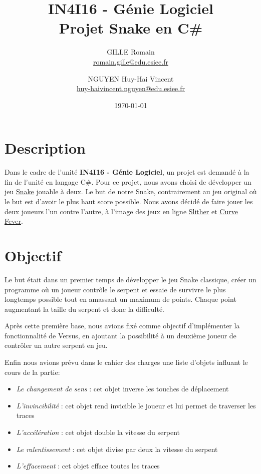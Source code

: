 \documentclass[12pt, french, a4paper]{article}
\title{
  \textbf{IN4I16 - Génie Logiciel\\
  Projet Snake en C\#}
}
\author{
  GILLE Romain \\
  \href{mailto:romain.gille@edu.esiee.fr}{romain.gille@edu.esiee.fr}
  \and
  NGUYEN Huy-Hai Vincent \\
  \href{mailto:huy-haivincent.nguyen@edu.esiee.fr}{huy-haivincent.nguyen@edu.esiee.fr}
}
\date{\today}
\begin{document}
  \maketitle
  \newpage


  \tableofcontents
  \newpage

  \section{Description}
    Dans le cadre de l'unité \textbf{IN4I16 - Génie Logiciel}, un projet est demandé à la fin de l'unité en langage C\#. Pour ce projet, nous avons choisi de développer un jeu \href{https://fr.wikipedia.org/wiki/Snake_(jeu_vid%C3%A9o)}{\underline{Snake}} jouable à deux.
    \newline
    Le but de notre Snake, contrairement au jeu original où le but est d'avoir le plus haut score possible. Nous avons décidé de faire jouer les deux joueurs l'un contre l'autre, à l'image des jeux en ligne \href{http://slither.io/}{\underline{Slither}} et \href{http://curvefever.io/}{\underline{Curve Fever}}.

  \section{Objectif}
  Le but était dans un premier temps de développer le jeu Snake classique, créer un programme où un joueur contrôle le serpent et essaie de survivre le plus longtemps possible tout en amassant un maximum de points. Chaque point augmentant la taille du serpent et donc la difficulté.

  \vspace{5mm}

  Après cette première base, nous avions fixé comme objectif d'implémenter la fonctionnalité de Versus, en ajoutant la possibilité à un deuxième joueur de contrôler un autre serpent en jeu.

  \vspace{5mm}

  Enfin nous avions prévu dans le cahier des charges une liste d'objets influant le cours de la partie:
  \begin{itemize}
    \item \textit{Le changement de sens} : cet objet inverse les touches de déplacement
    \item \textit{L'invincibilité} : cet objet rend invicible le joueur et lui permet de traverser les traces
    \item \textit{L'accélération} : cet objet double la vitesse du serpent
    \item \textit{Le ralentissement} : cet objet divise par deux la vitesse du serpent
    \item \textit{L'effacement} : cet objet efface toutes les traces
  \end{itemize}
\end{document}
